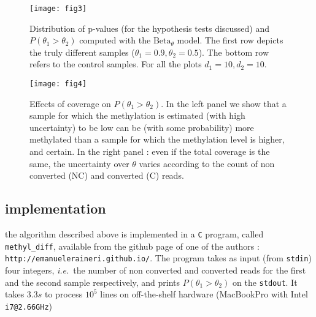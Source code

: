 \documentclass[11pt]{amsart}
\newcommand{\ie}{\textit{i.e.}\ }
\newcommand{\betapdf}{\mbox{Beta}_\theta}
\begin{document}
\begin{figure}[h]
\caption{Distribution of p-values (for the hypothesis tests discussed) and $P(\theta_1>\theta_2)$ computed with the $\betapdf$ model. The first row depicts the truly different samples ($\theta_1=0.9,\theta_2=0.5$). The bottom row refers to the control samples. For all the plots $d_1=10,d_2=10$.}
\texttt{[image: fig3]}
\label{pvalues}
\end{figure}
\begin{figure}[h]
\caption{Effects of coverage on $P(\theta_1>\theta_2)$. In the left panel we show that a sample for which the methylation is estimated (with high uncertainty) to be low can be (with some probability) more methylated than a sample for which the methylation level is higher, and certain. In the right panel : even if the total coverage is the same, the uncertainty over $\theta$ varies according to the count of  non converted (NC) and converted (C) reads.}
\texttt{[image: fig4]}
\label{cov}
\end{figure}

\subsection{implementation}
the algorithm described above is implemented in a \verb=C= program, called \verb=methyl_diff=, available from the github page of one of the authors : \verb=http://emanueleraineri.github.io/=. The program takes as input (from \verb=stdin=) four integers, \ie the number of non converted and converted reads for the first and the second sample respectively, and prints $P(\theta_1>\theta_2)$ on the \verb=stdout=. It takes $3.3s$ to process $10^5$ lines on off-the-shelf hardware (MacBookPro with Intel \verb=i7@2.66GHz=) 


\end{document}
